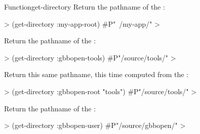 \documentclass[10pt,twoside,english,pdftex]{article}
\begin{document}
\begin{functiondoc}{Function}{get-directory}{
    }
Return the pathname of the  :
%
\W\supp
\begin{example}
  > (get-directory :my-app-root)
  #P"~/my-app/"
  >
\end{example}
%
Return the pathname of the 
:
%
\W\supp\notpretop
\begin{example}
  > (get-directory :gbbopen-tools)
  #P"/source/tools/"
  >
\end{example}
Return this same pathname, this time computed from the
 :
%
\W\supp\notpretop
\begin{example}
  > (get-directory :gbbopen-root "tools")
  #P"/source/tools/" 
  >
\end{example}
%
Return the pathname of the  :
%
\W\supp\notpretop
\begin{example}
  > (get-directory :gbbopen-user)
  #P"/source/gbbopen/"
  >
\end{example}

\end{functiondoc}

\end{document}
